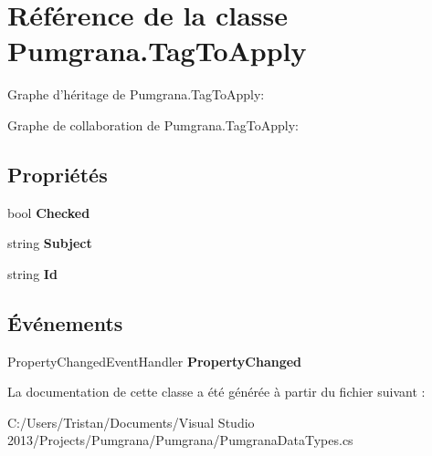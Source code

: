 \hypertarget{class_pumgrana_1_1_tag_to_apply}{\section{Référence de la classe Pumgrana.\+Tag\+To\+Apply}
\label{class_pumgrana_1_1_tag_to_apply}
}


Graphe d'héritage de Pumgrana.\+Tag\+To\+Apply\+:


Graphe de collaboration de Pumgrana.\+Tag\+To\+Apply\+:
\subsection*{Propriétés}
\begin{DoxyCompactItemize}
\item 
\hypertarget{class_pumgrana_1_1_tag_to_apply_a40d3caf06337ef016646e9340045a9a1}{bool {\bfseries Checked}}\label{class_pumgrana_1_1_tag_to_apply_a40d3caf06337ef016646e9340045a9a1}

\item 
\hypertarget{class_pumgrana_1_1_tag_to_apply_aff0f82192a39022ab8a7c97c8c95a8fe}{string {\bfseries Subject}}\label{class_pumgrana_1_1_tag_to_apply_aff0f82192a39022ab8a7c97c8c95a8fe}

\item 
\hypertarget{class_pumgrana_1_1_tag_to_apply_a656b0d108af28362af8ed7425b20fc71}{string {\bfseries Id}}\label{class_pumgrana_1_1_tag_to_apply_a656b0d108af28362af8ed7425b20fc71}

\end{DoxyCompactItemize}
\subsection*{Événements}
\begin{DoxyCompactItemize}
\item 
\hypertarget{class_pumgrana_1_1_tag_to_apply_a73e2ddbe580ff3c78cf5ad6d3ec4bf41}{Property\+Changed\+Event\+Handler {\bfseries Property\+Changed}}\label{class_pumgrana_1_1_tag_to_apply_a73e2ddbe580ff3c78cf5ad6d3ec4bf41}

\end{DoxyCompactItemize}


La documentation de cette classe a été générée à partir du fichier suivant \+:\begin{DoxyCompactItemize}
\item 
C\+:/\+Users/\+Tristan/\+Documents/\+Visual Studio 2013/\+Projects/\+Pumgrana/\+Pumgrana/Pumgrana\+Data\+Types.\+cs\end{DoxyCompactItemize}
